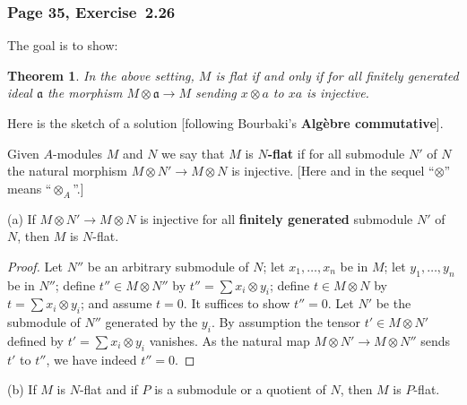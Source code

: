 \documentclass[12pt,letterpaper]{article}%
\newcommand{\mf}{\mathfrak}
\newcommand{\aaa}{\mf a}
\newcommand{\nn}{\noindent}
\newtheorem{thm}{Theorem}%
\begin{document}

\subsubsection{Page 35, Exercise~2.26}\label{ex2.26}%

The goal is to show:

\begin{thm}\label{flatcrit}
In the above setting, $M$ is flat if and only if for all finitely generated ideal $\aaa$ the morphism $M\otimes\aaa\to M$ sending $x\otimes a$ to $xa$ is injective.
\end{thm}

Here is the sketch of a solution [following Bourbaki's \textbf{Algèbre commutative}].

Given $A$-modules $M$ and $N$ we say that $M$ is $N$\textbf{-flat} if for all submodule $N'$ of $N$ the natural morphism $M\otimes N'\to M\otimes N$ is injective. [Here and in the sequel ``$\otimes$'' means ``$\otimes_A$''.] 

\nn(a) If $M\otimes N'\to M\otimes N$ is injective for all \textbf{finitely generated} submodule $N'$ of $N$, then $M$ is $N$-flat.

\begin{proof} 
Let $N''$ be an arbitrary submodule of $N$; let $x_1,\dots,x_n$ be in $M$; let $y_1,\dots,y_n$ be in $N''$; define $t''\in M\otimes N''$ by $t''=\sum x_i\otimes y_i$; define $t\in M\otimes N$ by $t=\sum x_i\otimes y_i$; and assume $t=0$. It suffices to show $t''=0$. Let $N'$ be the submodule of $N''$ generated by the $y_i$. By assumption the tensor $t'\in M\otimes N'$ defined by $t'=\sum x_i\otimes y_i$ vanishes. As the natural map $M\otimes N'\to M\otimes N''$ sends $t'$ to $t''$, we have indeed $t''=0$. 
\end{proof}

\nn(b) If $M$ is $N$-flat and if $P$ is a submodule or a quotient of $N$, then $M$ is $P$-flat. 
\end{document}
